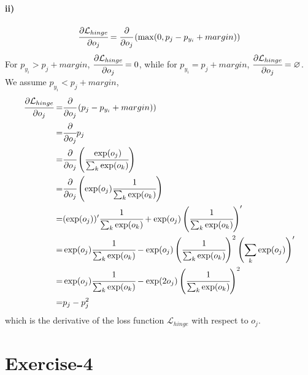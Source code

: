 \documentclass[10pt]{article}
\begin{document}
\paragraph{ii)}\begin{align*}
\cfrac{\partial \mathcal{L}_{hinge}}{\partial o_j} = \cfrac{\partial}{\partial o_j} \left(   \max(0, p_j - p_{y_i} + margin) \right)
\end{align*}
For $p_{y_i} > p_j + margin$, $\cfrac{\partial \mathcal{L}_{hinge}}{\partial o_j} = 0$, while for $p_{y_i} = p_j + margin$, $\cfrac{\partial \mathcal{L}_{hinge}}{\partial o_j} = \varnothing$.
We assume $p_{y_i} < p_j + margin$,
\begin{align*}
\cfrac{\partial \mathcal{L}_{hinge}}{\partial o_j} =& \cfrac{\partial}{\partial o_j} \left(   p_j - p_{y_i} + margin) \right)\\
=& \cfrac{\partial}{\partial o_j} p_j\\
=& \cfrac{\partial}{\partial o_j} \left( \cfrac{\exp(o_j)}{\sum_k \exp(o_k)} \right)\\
=& \cfrac{\partial}{\partial o_j} \left( \exp(o_j) \cfrac{1}{\sum_k \exp(o_k)} \right)\\
=& (\exp(o_j))' \cfrac{1}{\sum_k \exp(o_k)} + \exp(o_j) \left( \cfrac{1}{\sum_k \exp(o_k)} \right)'  \\
=& \exp(o_j) \cfrac{1}{\sum_k \exp(o_k)} - \exp(o_j) \left( \cfrac{1}{\sum_k \exp(o_k)} \right)^2 \left( \sum_k \exp(o_j) \right)'  \\
=& \exp(o_j) \cfrac{1}{\sum_k \exp(o_k)} - \exp(2o_j) \left( \cfrac{1}{\sum_k \exp(o_k)} \right)^2\\
=& p_j - p_j^2
\end{align*}
which is the derivative of the loss function $\mathcal{L}_{hinge}$ with respect to $o_j$.



\section*{Exercise-4}
\end{document}
